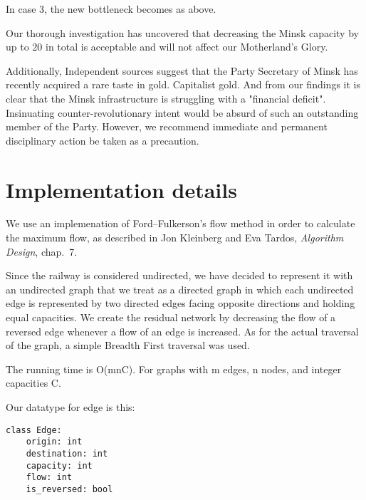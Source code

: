 \documentclass{tufte-handout}
\begin{document}
 In case 3, the new bottleneck becomes as above.

\bigskip
\bigskip
\bigskip
\bigskip

Our thorough investigation has uncovered that decreasing the Minsk capacity by up to 20 in total is acceptable and will not affect our Motherland's Glory. 

 Additionally, Independent sources suggest that the Party Secretary of Minsk has recently acquired a rare taste in gold. Capitalist gold. And from our findings it is clear that the Minsk infrastructure is struggling with a "financial deficit". Insinuating counter-revolutionary intent would be absurd of such an outstanding member of the Party. However, we recommend immediate and permanent disciplinary action be taken as a precaution.

  \section{Implementation details}

   We use an implemenation of Ford--Fulkerson's flow method in order to calculate the maximum flow, as described in Jon Kleinberg and Eva Tardos, \emph{Algorithm Design}, chap.~7.

  Since the railway is considered undirected, we have decided to represent it with an undirected graph that we treat as a directed graph in which each undirected edge is represented by two directed edges facing opposite directions and holding equal capacities.
We create the residual network by decreasing the flow of a reversed edge whenever a flow of an edge is increased.
As for the actual traversal of the graph, a simple Breadth First traversal was used.

\bigskip

  The running time is O(mnC). For graphs with m edges, n nodes, and integer capacities C.

\bigskip

  Our datatype for edge is this:

  \begin{verbatim}
class Edge:
    origin: int
    destination: int
    capacity: int
    flow: int
    is_reversed: bool
  \end{verbatim}
\end{document}
